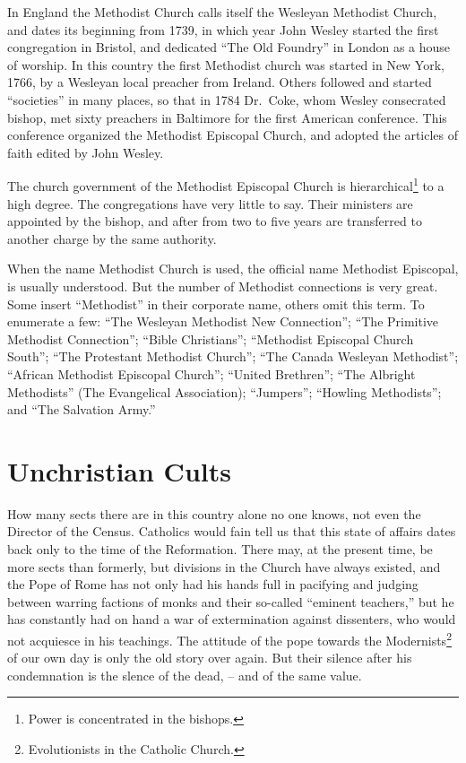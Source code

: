 \documentclass[
]{book}
\begin{document}
In England the Methodist Church calls itself the Wesleyan Methodist Church, and dates its beginning from 1739, in which year John Wesley started the first congregation in Bristol, and dedicated ``The Old Foundry'' in London as a house of worship. In this country the first Methodist church was started in New York, 1766, by a Wesleyan local preacher from Ireland. Others followed and started ``societies'' in many places, so that in 1784 Dr.~Coke, whom Wesley consecrated bishop, met sixty preachers in Baltimore for the first American conference. This conference organized the Methodist Episcopal Church, and adopted the articles of faith edited by John Wesley.

The church government of the Methodist Episcopal Church is hierarchical\footnote{Power is concentrated in the bishops.} to a high degree. The congregations have very little to say. Their ministers are appointed by the bishop, and after from two to five years are transferred to another charge by the same authority.

When the name Methodist Church is used, the official name Methodist Episcopal, is usually understood. But the number of Methodist connections is very great. Some insert ``Methodist'' in their corporate name, others omit this term. To enumerate a few: ``The Wesleyan Methodist New Connection''; ``The Primitive Methodist Connection''; ``Bible Christians''; ``Methodist Episcopal Church South''; ``The Protestant Methodist Church''; ``The Canada Wesleyan Methodist''; ``African Methodist Episcopal Church''; ``United Brethren''; ``The Albright Methodists'' (The Evangelical Association); ``Jumpers''; ``Howling Methodists''; and ``The Salvation Army.''

\section{Unchristian Cults}\label{unchristian-cults}

How many sects there are in this country alone no one knows, not even the Director of the Census. Catholics would fain tell us that this state of affairs dates back only to the time of the Reformation. There may, at the present time, be more sects than formerly, but divisions in the Church have always existed, and the Pope of Rome has not only had his hands full in pacifying and judging between warring factions of monks and their so-called ``eminent teachers,'' but he has constantly had on hand a war of extermination against dissenters, who would not acquiesce in his teachings. The attitude of the pope towards the Modernists\footnote{Evolutionists in the Catholic Church.} of our own day is only the old story over again. But their silence after his condemnation is the slence of the dead, -- and of the same value.
\end{document}
